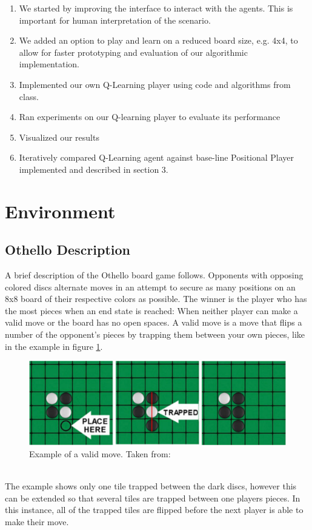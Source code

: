 \documentclass{article}
\begin{document}
\begin{enumerate}
    \item We started by improving the interface to interact with the agents. This is important for human interpretation of the scenario.
    \item We added an option to play and learn on a reduced board size, e.g. 4x4, to allow for faster prototyping and evaluation of our algorithmic implementation.
    \item Implemented our own Q-Learning player using code and algorithms from class.
    \item Ran experiments on our Q-learning player to evaluate its performance
    \item Visualized our results
    \item Iteratively compared Q-Learning agent against base-line Positional Player implemented and described in section 3.
\end{enumerate}

\section{\label{doc:env}Environment}
\subsection{Othello Description}
A brief description of the Othello board game follows. Opponents with opposing colored discs alternate moves in an attempt to secure as many positions on an 8x8 board of their respective colors as possible. The winner is the player who has the most pieces when an end state is reached: When neither player can make a valid move or the board has no open spaces. A valid move is a move that flips a number of the opponent’s pieces by trapping them between your own pieces, like in the example in figure \ref{fig:valid_move}. 
\begin{figure}[ht] %
\centering
\includegraphics[width=0.75\linewidth]{figures/valid_move.png}
\caption{\label{fig:valid_move}Example of a valid move. Taken from: \cite{picture}}
\end{figure}
\\The example shows only one tile trapped between the dark discs, however this can be extended so that several tiles are trapped between one players pieces. In this instance, all of the trapped tiles are flipped before the next player is able to make their move.
\end{document}
